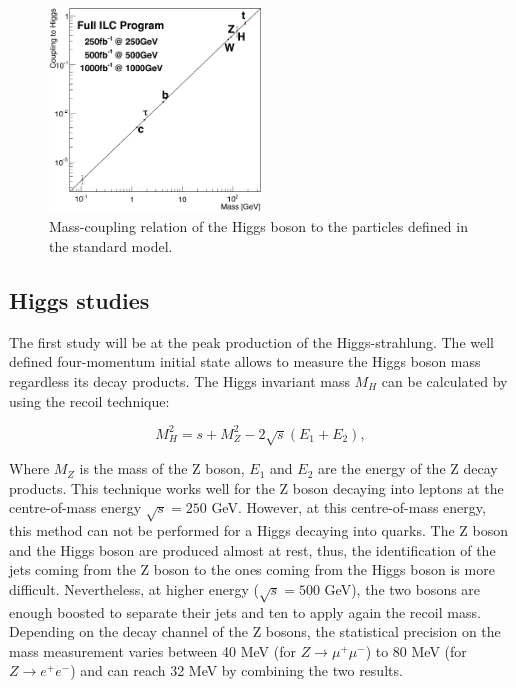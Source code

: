     \begin{figure}[!h]
      \centering
      \includegraphics[width = 0.5\textwidth]{Pictures/Higgs/Chapter_Theory_figs_mass-coupling1TeV.png}
      \caption{Mass-coupling relation of the Higgs boson to the particles defined in the standard model\cite{tian}.}
      \label{fig:coupling}
    \end{figure}

    \subsection{Higgs studies}

    The first study will be at the peak production of the Higgs-strahlung. 
    The well defined four-momentum initial state allows to measure the Higgs boson mass regardless its decay products.
    The Higgs invariant mass $M_H$ can be calculated by using the recoil technique:

    \begin{equation}
      M^2_H = s + M^2_Z - 2 \sqrt{s}\left(E_{1} + E_{2}\right),
    \end{equation}

    Where $M_Z$ is the mass of the Z boson, $E_1$ and $E_2$ are the energy of the Z decay products. 
    This technique works well for the Z boson decaying into leptons at the centre-of-mass energy $\sqrt{s} = 250$ GeV.
    However, at this centre-of-mass energy, this method can not be performed for a Higgs decaying into quarks. 
    The Z boson and the Higgs boson are produced almost at rest, thus, the identification of the jets coming from the Z boson to the ones coming from the Higgs boson is more difficult.
    Nevertheless, at higher energy ($\sqrt{s} = 500$ GeV), the two bosons are enough boosted to separate their jets and ten to apply again the recoil mass.
    Depending on the decay channel of the Z bosons, the statistical precision on the mass measurement varies between 40 MeV (for $Z \rightarrow \mu^+\mu^-$) to 80 MeV (for $Z \rightarrow e^+e^-$) and can reach 32 MeV by combining the two results.


